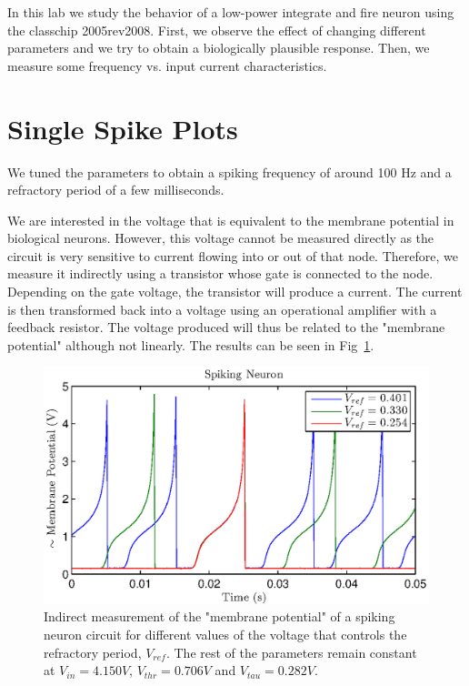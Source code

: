 

\newcommand{\reffig}[1]{Fig.~\ref{#1}}



\newpage

In this lab we study the behavior of a low-power integrate and fire neuron using the classchip 2005rev2008. First, we observe the effect of changing different parameters and we try to obtain a biologically plausible response. Then, we measure some frequency vs. input current characteristics. \\

\section{Single Spike Plots}

We tuned the parameters to obtain a spiking frequency of around 100 Hz and a refractory period of a few milliseconds. 

We are interested in the voltage that is equivalent to the membrane potential in biological neurons. However, this voltage cannot be measured directly as the circuit is very sensitive to current flowing into or out of that node. Therefore, we measure it indirectly using a transistor whose gate is connected to the node. Depending on the gate voltage, the transistor will produce a current. The current is then transformed back into a voltage using an operational amplifier with a feedback resistor. The voltage produced will thus be related to the "membrane potential" although not linearly. The results can be seen in Fig~\ref{fig:exp1a}. 
\begin{figure}[!h]
    \center
    \includegraphics{exp1a.eps}
    \caption{Indirect measurement of the "membrane potential" of a spiking neuron circuit for different values of the voltage that controls the refractory period, $V_{ref}$. The rest of the parameters remain constant at $V_{in}=4.150 V$, $V_{thr}=0.706 V$ and $V_{tau}=0.282 V$. }
    \label{fig:exp1a}
\end{figure}

